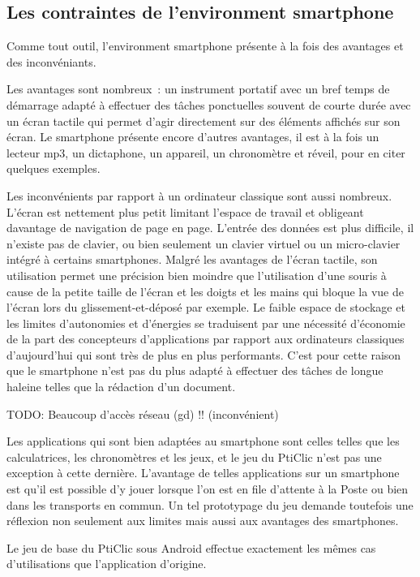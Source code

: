 \documentclass[a4paper,11pt,french]{article}
\begin{document}
\subsection{Les contraintes de l'environment smartphone}

Comme tout outil, l'environment smartphone présente à la fois des avantages et des inconvéniants. 

Les avantages sont nombreux~: un instrument portatif avec un bref temps de démarrage adapté à effectuer des tâches ponctuelles souvent de courte durée avec un écran tactile qui permet d'agir directement sur des éléments affichés sur son écran. Le smartphone présente encore d'autres avantages, il est à la fois un lecteur mp3, un dictaphone, un appareil, un chronomètre et réveil, pour en citer quelques exemples.

Les inconvénients par rapport à un ordinateur classique sont aussi nombreux. L'écran est nettement plus petit limitant l'espace de travail et obligeant davantage de navigation de page en page. L'entrée des données est plus difficile, il n'existe pas de clavier, ou bien seulement un clavier virtuel ou un micro-clavier intégré à certains smartphones. Malgré les avantages de l'écran tactile, son utilisation permet une précision bien moindre que l'utilisation d'une souris à cause de la petite taille de l'écran et les doigts et les mains qui bloque la vue de l'écran lors du glissement-et-déposé par exemple. Le faible espace de stockage et les limites d'autonomies et d'énergies se traduisent par une nécessité d'économie de la part des concepteurs d'applications par rapport aux ordinateurs classiques d'aujourd'hui qui sont très de plus en plus performants. C'est pour cette raison que le smartphone n'est pas du plus adapté à effectuer des tâches de longue haleine telles que la rédaction d'un document.

TODO: Beaucoup d'accès réseau (gd) !! (inconvénient)

Les applications qui sont bien adaptées au smartphone sont celles telles que les calculatrices, les chronomètres et les jeux, et le jeu du PtiClic n'est pas une exception à cette dernière. L'avantage de telles applications sur un smartphone est qu'il est possible d'y jouer lorsque l'on est en file d'attente à la Poste ou bien dans les transports en commun. Un tel prototypage du jeu demande toutefois une réflexion non seulement aux limites mais aussi aux avantages des smartphones.

Le jeu de base du PtiClic sous Android effectue exactement les mêmes cas d'utilisations que l'application d'origine. 
\end{document}

